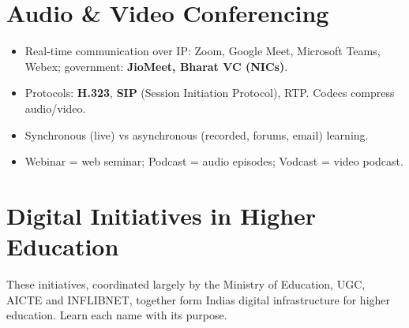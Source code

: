 \needspace{95pt}

\hypertarget{p1-08--5-audio--video-conferencing}{%
\section{Audio \& Video Conferencing}\label{p1-08--5-audio--video-conferencing}}

\begin{itemize}
\tightlist
\item
  Real-time communication over IP: Zoom, Google Meet, Microsoft Teams, Webex; government: \textbf{JioMeet, Bharat VC (NIC\textquotesingle s)}.
\item
  Protocols: \textbf{H.323}, \textbf{SIP} (Session Initiation Protocol), RTP. Codecs compress audio/video.
\item
  Synchronous (live) vs asynchronous (recorded, forums, email) learning.
\item
  Webinar = web seminar; Podcast = audio episodes; Vodcast = video podcast.
\end{itemize}

\needspace{160pt}

\hypertarget{p1-08--6-digital-initiatives-in-higher-education}{%
\section{Digital Initiatives in Higher Education}\label{p1-08--6-digital-initiatives-in-higher-education}}

These initiatives, coordinated largely by the Ministry of Education, UGC, AICTE and INFLIBNET, together
form India\textquotesingle s digital infrastructure for higher education. Learn each name with its purpose.

\begingroup\small


